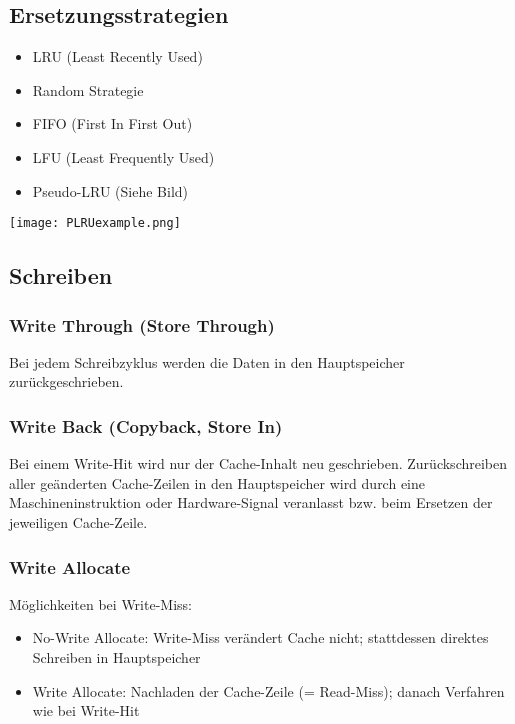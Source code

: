 \subsection{Ersetzungsstrategien}

\begin{itemize}
    \itemsep-.5em 
    \item LRU (Least Recently Used)
    \item Random Strategie
    \item FIFO (First In First Out)
    \item LFU (Least Frequently Used)
    \item Pseudo-LRU (Siehe Bild)
\end{itemize}

\begin{center}
    \texttt{[image: PLRUexample.png]}
\end{center}

\subsection{Schreiben}

\subsubsection{Write Through (Store Through)}

Bei jedem Schreibzyklus werden die Daten in den Hauptspeicher zurückgeschrieben.

\subsubsection{Write Back (Copyback, Store In)}

Bei einem Write-Hit wird nur der Cache-Inhalt neu geschrieben.
Zurückschreiben aller geänderten Cache-Zeilen in den Hauptspeicher wird
durch eine Maschineninstruktion oder Hardware-Signal veranlasst bzw. beim Ersetzen der jeweiligen Cache-Zeile.

\subsubsection{Write Allocate}

Möglichkeiten bei Write-Miss:
\begin{itemize}
    \itemsep-.5em 
    \item No-Write Allocate: Write-Miss verändert Cache nicht; stattdessen direktes Schreiben in Hauptspeicher
    \item Write Allocate: Nachladen der Cache-Zeile (= Read-Miss); danach Verfahren wie bei Write-Hit
\end{itemize}

